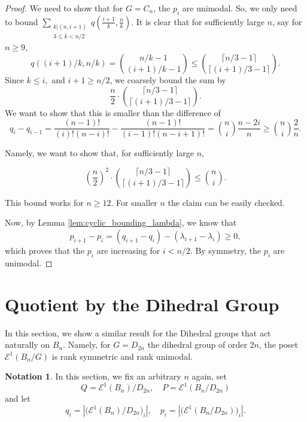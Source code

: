 \documentclass[10 pt]{amsart}
\theoremstyle{plain}
\theoremstyle{definition}
\newtheorem{note}[thm]{Notation}
\theoremstyle{remark}
\numberwithin{equation}{section}
\newcommand{\dstyle}{\displaystyle}
\begin{document}
\begin{proof}

We need to show that for $G= C_n$, the $p_i$ are unimodal. So, we only need to bound $ \dstyle \sum_{\substack{k | (n , i+1)\\ 3 \le k < n/2 }} q (\frac{i+1}{k}, \frac{n}{k}) $. It is clear that for sufficiently large $n$, say for $n \ge 9$, $$q((i+1)/k, n/k) = {n/k - 1 \choose (i+1)/k -1} \le {\lceil n/3-1 \rceil \choose \lceil (i+1)/3 -1 \rceil }.$$ Since $k \leq i,$ and $ i+1 \ge n/2$, we coarsely bound the sum by $$\frac{n}{2} \cdot {\lceil n/3-1 \rceil \choose \lceil (i+1)/3 -1 \rceil }. $$ We want to show that this is smaller than the difference of $$q_i - q_{i-1} = \frac{(n-1)!}{(i)! (n-i)!} - \frac{(n-1)!}{(i-1)!(n-i+1)!}= {n \choose i } \frac{n-2i}{n} \ge  {n \choose i } \frac{2}{n} .$$

Namely, we want to show that, for sufficiently large $n$, 

$$ \left(\frac{n}{2}\right)^2 \cdot {\lceil n/3-1 \rceil \choose \lceil (i+1)/3 -1 \rceil }  \le   {n \choose i}.$$

This bound works for $n \ge 12$. For smaller $n$ the claim can be easily checked. 

Now, by Lemma \ref{lem:cyclic_bounding_lambda}, we know that $$p_{i+1} - p_{i} =  (q_{i+1} - q_i) - (\lambda_{i+1}- \lambda_i) \ge 0,$$  which proves that the $p_i$ are increasing for $i < n/2$. By symmetry, the $p_i$ are unimodal.

\end{proof}







\section{Quotient by the Dihedral Group}
\label{sec:dihedral}

In this section, we show a similar result for the Dihedral groups that act naturally on $B_n$. Namely, for $G = D_{2n}$ the dihedral group of order $2n$, the poset $\mathcal E^1(B_n/G)$ is rank symmetric and rank unimodal.


\begin{note} In this section, we fix an arbitrary $n$ again, set $$Q = \mathcal E^1 (B_n)/D_{2n}, \quad P = \mathcal E^1(B_n/D_{2n})$$ and let $$q_i = |\big( \mathcal E^1 (B_n)/D_{2n} \big)_i|, \quad p_i = |\big( \mathcal E^1(B_n/D_{2n}) \big)_i|. $$ 
\end{note}
\end{document}
